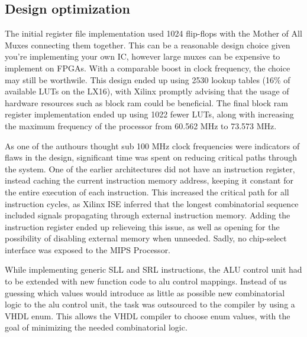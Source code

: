 \subsection{Design optimization}

The initial register file implementation used 1024 flip-flops with the Mother of All Muxes connecting them together.
This can be a reasonable design choice given you're implementing your own IC, however large muxes can be expensive to implement on FPGAs.
With a comparable boost in clock frequency, the choice may still be worthwile.
This design ended up using 2530 lookup tables (16\% of available LUTs on the LX16), with Xilinx promptly advising that the usage of hardware resources such as block ram could be beneficial.
The final block ram register implementation ended up using 1022 fewer LUTs, along with increasing the maximum frequency of the processor from 60.562 MHz to 73.573 MHz.

As one of the authours thought sub 100 MHz clock frequencies were indicators of flaws in the design, significant time was spent on reducing critical paths through the system.
One of the earlier architectures did not have an instruction register, instead caching the current instruction memory address, keeping it constant for the entire execution of each instruction.
This increased the critical path for all instruction cycles, as Xilinx ISE inferred that the longest combinatorial sequence included signals propagating through external instruction memory.
Adding the instruction register ended up relieveing this issue, as well as opening for the possibility of disabling external memory when unneeded.
Sadly, no chip-select interface was exposed to the MIPS Processor.

While implementing generic SLL and SRL instructions, the ALU control unit had to be extended with new function code to alu control mappings.
Instead of us guessing which values would introduce as little as possible new combinatorial logic to the alu control unit, the task was outsourced to the compiler by using a VHDL enum.
This allows the VHDL compiler to choose enum values, with the goal of minimizing the needed combinatorial logic.
